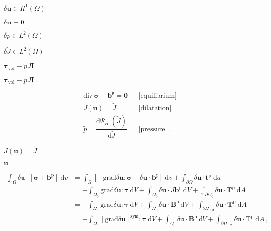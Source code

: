 \documentclass{article}
\begin{document}
$\delta \mathbf{u} \in H^1(\Omega)$
\pagebreak

$\delta \mathbf{u} = \mathbf{0}$
\pagebreak

$\delta \widetilde{p} \in L^2(\Omega)$
\pagebreak

$\delta \widetilde{J} \in L^2(\Omega)$
\pagebreak

$\boldsymbol{\tau}_{\textrm{vol}} \equiv \widetilde{p} J \mathbf{I}$
\pagebreak

$\boldsymbol{\tau}_{\textrm{vol}} \equiv p J\mathbf{I}$
\pagebreak

\begin{align*} &\textrm{div}\ \boldsymbol{\sigma} + \mathbf{b}^\text{p} = \mathbf{0} && \textrm{[equilibrium]} \\ &J(\mathbf{u}) = \widetilde{J} && \textrm{[dilatation]} \\ &\widetilde{p} = \dfrac{\textrm{d} \Psi_{\textrm{vol}}(\widetilde{J})}{\textrm{d} \widetilde{J}} && \textrm{[pressure]} \, . \end{align*}
\pagebreak

$J(\mathbf{u}) = \widetilde{J}$
\pagebreak

$\mathbf{u}$
\pagebreak

\begin{align*} \int_{\Omega}\delta \mathbf{u} \cdot [ \boldsymbol{\sigma} + \mathbf{b}^\text{p}]~\mathrm{d}v &= \int_{\Omega} [-\mathrm{grad}\delta \mathbf{u}:\boldsymbol{\sigma} + \delta \mathbf{u} \cdot\mathbf{b}^\text{p}]~\mathrm{d}v + \int_{\partial \Omega} \delta \mathbf{u} \cdot \mathbf{t}^\text{p}~\mathrm{d}a \\ &= - \int_{\Omega_0} \mathrm{grad}\delta \mathbf{u}:\boldsymbol{\tau}~\mathrm{d}V + \int_{\Omega_0} \delta \mathbf{u} \cdot J\mathbf{b}^\text{p}~\mathrm{d}V + \int_{\partial \Omega_0} \delta \mathbf{u} \cdot \mathbf{T}^\text{p}~\mathrm{d}A \\ &= - \int_{\Omega_0} \mathrm{grad}\delta \mathbf{u}:\boldsymbol{\tau}~\mathrm{d}V + \int_{\Omega_0} \delta \mathbf{u} \cdot \mathbf{B}^\text{p}~\mathrm{d}V + \int_{\partial \Omega_{0,\sigma}} \delta \mathbf{u} \cdot \mathbf{T}^\text{p}~\mathrm{d}A \\ &= - \int_{\Omega_0} [\mathrm{grad}\delta\mathbf{u}]^{\text{sym}} :\boldsymbol{\tau}~\mathrm{d}V + \int_{\Omega_0} \delta \mathbf{u} \cdot \mathbf{B}^\text{p}~\mathrm{d}V + \int_{\partial \Omega_{0,\sigma}} \delta \mathbf{u} \cdot \mathbf{T}^\text{p}~\mathrm{d}A \, , \end{align*}
\pagebreak
\end{document}
